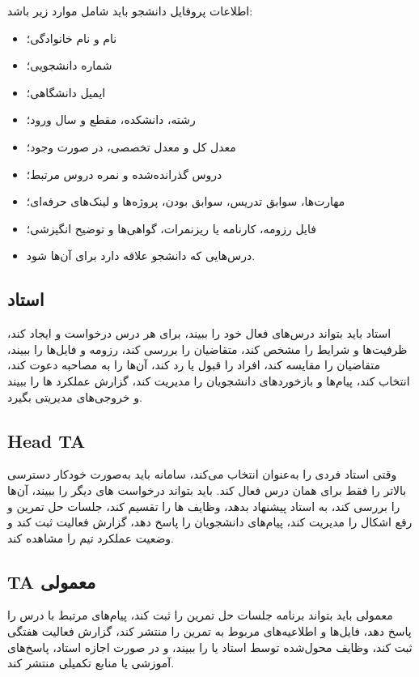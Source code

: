 \documentclass[12pt,a4paper]{article}
\begin{document}
اطلاعات پروفایل دانشجو باید شامل موارد زیر باشد:
\begin{itemize}
\item نام و نام خانوادگی؛
\item شماره دانشجویی؛
\item ایمیل دانشگاهی؛
\item رشته، دانشکده، مقطع و سال ورود؛
\item معدل کل و معدل تخصصی، در صورت وجود؛
\item دروس گذرانده‌شده و نمره دروس مرتبط؛
\item مهارت‌ها، سوابق تدریس، سوابق  بودن، پروژه‌ها و لینک‌های حرفه‌ای؛
\item فایل رزومه، کارنامه یا ریزنمرات، گواهی‌ها و توضیح انگیزشی؛
\item درس‌هایی که دانشجو علاقه دارد برای آن‌ها  شود.
\end{itemize}

\subsection{استاد}
استاد باید بتواند درس‌های فعال خود را ببیند، برای هر درس درخواست  و  ایجاد کند، ظرفیت‌ها و شرایط را مشخص کند، متقاضیان را بررسی کند، رزومه و فایل‌ها را ببیند، متقاضیان را مقایسه کند، افراد را قبول یا رد کند، آن‌ها را به مصاحبه دعوت کند،  انتخاب کند، پیام‌ها و بازخوردهای دانشجویان را مدیریت کند، گزارش عملکرد ها را ببیند و خروجی‌های مدیریتی بگیرد.

\subsection{Head TA}
وقتی استاد فردی را به‌عنوان  انتخاب می‌کند، سامانه باید به‌صورت خودکار دسترسی بالاتر را فقط برای همان درس فعال کند.  باید بتواند درخواست های دیگر را ببیند، آن‌ها را بررسی کند، به استاد پیشنهاد بدهد، وظایف ها را تقسیم کند، جلسات حل تمرین و رفع اشکال را مدیریت کند، پیام‌های دانشجویان را پاسخ دهد، گزارش فعالیت ثبت کند و وضعیت عملکرد تیم  را مشاهده کند.

\subsection{TA معمولی}
 معمولی باید بتواند برنامه جلسات حل تمرین را ثبت کند، پیام‌های مرتبط با درس را پاسخ دهد، فایل‌ها و اطلاعیه‌های مربوط به تمرین را منتشر کند، گزارش فعالیت هفتگی ثبت کند، وظایف محول‌شده توسط استاد یا  را ببیند، و در صورت اجازه استاد، پاسخ‌های آموزشی یا منابع تکمیلی منتشر کند.
\end{document}
